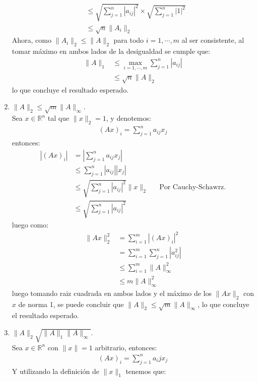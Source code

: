\begin{homeworkProblem}
\begin{solucion}
\begin{enumerate}
\begin{align*}
          &\leq \sqrt{\sum_{j=1}^n|a_{ij}|^{2}}\times \sqrt{\sum_{j=1}^{n}|1|^2}\\
          &\leq \sqrt{n}\|A_i\|_{2}
        \end{align*}
        Ahora, como $\|A_i\|_{2}\leq \|A\|_{2}$ para todo $i=1,\cdots,m$ al ser consistente, al tomar máximo en ambos lados de la desigualdad se cumple que:
        \begin{align*}
          \|A\|_{1}&\leq \max_{i=1,\cdots,m}\sum_{j=1}^{n}|a_{ij}|\\
          &\leq \sqrt{n}\|A\|_{2}
        \end{align*}
        lo que concluye el resultado esperado.
        \demostrado
      \item $\|A\|_{2}\leq\sqrt{m}\|A\|_{\infty}$.\\
        Sea $x\in \mathbb{R}^{n}$ tal que $\|x\|_2=1$, y denotemos:
        \begin{align*}
          (Ax)_{i}=\sum_{j=1}^{n}a_{ij}x_{j}
        \end{align*}
        entonces:
        \begin{align*}
          |(Ax)_i|&=\left|\sum_{j=1}^na_{ij}x_{j}\right|\\
          &\leq \sum_{j=1}^{n}|a_{ij}||x_j|\\
          &\leq \sqrt{\sum_{j=1}^{n}|a_{ij}|^2}\|x\|_{2} &&\text{Por Cauchy-Schawrz.}\\
          &\leq \sqrt{\sum_{j=1}^{n}|a_{ij}|^2}
        \end{align*}
        luego como:
        \begin{align*}
          \|Ax\|_2^2&=\sum_{i=1}^{m}|(Ax)_i|^2\\
          &=\sum_{i=1}^{m}\sum_{j=1}^n|a_{ij}^2|\\
          &\leq \sum_{i=1}^{m}\|A\|^2_{\infty}\\
          &\leq m\|A\|^2_{\infty}
        \end{align*}
        luego tomando raiz cuadrada en ambos lados y el máximo de los $\|Ax\|_2$ con $x$ de norma 1, se puede concluir que $\|A\|_2\leq \sqrt{m}\|A\|_{\infty}$, lo que concluye el resultado esperado.
      \item $\|A\|_2\sqrt{\|A\|_1\|A\|_\infty}$.\\
        Sea $x\in\mathbb{R}^{n}$ con $\|x\|=1$ arbitrario, entonces:
        \begin{align*}
          (Ax)_i=\sum_{j=1}^{n}a_ijx_j
        \end{align*}
        Y utilizando la definición de $\|x\|_1$ tenemos que:

\end{enumerate}
\end{solucion}
\end{homeworkProblem}
